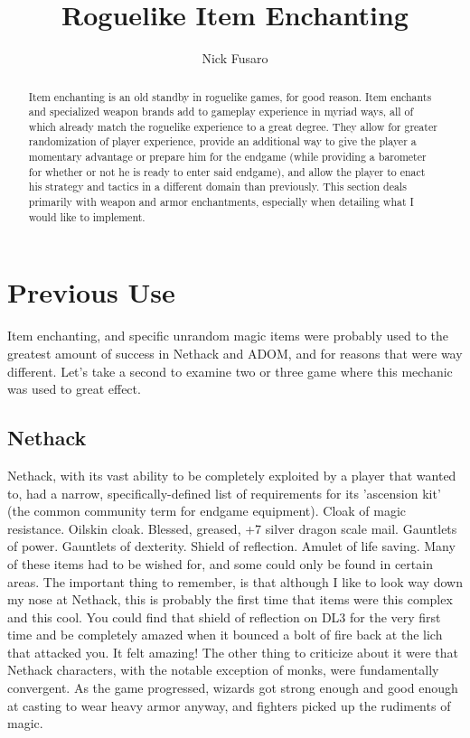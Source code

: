\documentclass[a4paper,11pt]{article}
\title{Roguelike Item Enchanting}
\author{Nick Fusaro}
\begin{document}
\maketitle
\tableofcontents

\begin{abstract}
Item enchanting is an old standby in roguelike games, for good reason. Item enchants and specialized weapon brands add to gameplay experience in myriad ways, all of which already match the roguelike experience to a great degree. They allow for greater randomization of player experience, provide an additional way to give the player a momentary advantage or prepare him for the endgame (while providing a barometer for whether or not he is ready to enter said endgame), and allow the player to enact his strategy and tactics in a different domain than previously. This section deals primarily with weapon and armor enchantments, especially when detailing what I would like to implement.
\end{abstract}


\section{Previous Use}
Item enchanting, and specific unrandom magic items were probably used to the greatest amount of success in Nethack and ADOM, and for reasons that were way different. Let's take a second to examine two or three game where this mechanic was used to great effect.

\subsection{Nethack} Nethack, with its vast ability to be completely exploited by a player that wanted to, had a narrow, specifically-defined list of requirements for its 'ascension kit' (the common community term for endgame equipment). Cloak of magic resistance. Oilskin cloak. Blessed, greased, +7 silver dragon scale mail. Gauntlets of power. Gauntlets of dexterity. Shield of reflection. Amulet of life saving. Many of these items had to be wished for, and some could only be found in certain areas. The important thing to remember, is that although I like to look way down my nose at Nethack, this is probably the first time that items were this complex and this cool. You could find that shield of reflection on DL3 for the very first time and be completely amazed when it bounced a bolt of fire back at the lich that attacked you. It felt amazing! The other thing to criticize about it were that Nethack characters, with the notable exception of monks, were fundamentally convergent. As the game progressed, wizards got strong enough and good enough at casting to wear heavy armor anyway, and fighters picked up the rudiments of magic. 
\end{document}
